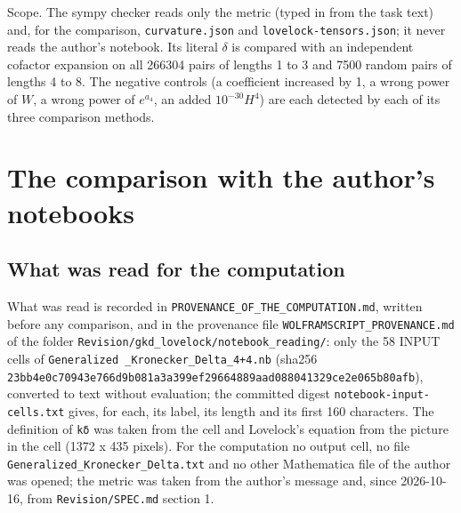 \documentclass[11pt]{article}
\begin{document}
Scope. The sympy checker reads only the metric (typed in from the task text) and, for the comparison, \texttt{curvatur\allowbreak{}e.json} and \texttt{lovelock\allowbreak{}-tensors\allowbreak{}.json}; it never reads the author's notebook. Its literal $\delta$ is compared with an independent cofactor expansion on all 266304 pairs of lengths 1 to 3 and 7500 random pairs of lengths 4 to 8. The negative controls (a coefficient increased by 1, a wrong power of $W$, a wrong power of $e^{a_4}$, an added $10^{-30}H^4$) are each detected by each of its three comparison methods.

\section{The comparison with the author's notebooks}

\subsection{What was read for the computation}

What was read is recorded in \texttt{PROVENAN\allowbreak{}CE\_OF\_TH\allowbreak{}E\_COMPUT\allowbreak{}ATION.md}, written before any comparison, and in the provenance file \texttt{WOLFRAMS\allowbreak{}CRIPT\_PR\allowbreak{}OVENANCE\allowbreak{}.md} of the folder \texttt{Revision\allowbreak{}/gkd\_lov\allowbreak{}elock/no\allowbreak{}tebook\_r\allowbreak{}eading/}: only the 58 INPUT cells of \texttt{Generali\allowbreak{}zed \_Kro\allowbreak{}necker\_D\allowbreak{}elta\_4+4\allowbreak{}.nb} (sha256 \texttt{23bb4e0c\allowbreak{}70943e76\allowbreak{}6d9b081a\allowbreak{}3a399ef2\allowbreak{}9664889a\allowbreak{}ad088041\allowbreak{}329ce2e0\allowbreak{}65b80afb}), converted to text without evaluation; the committed digest \texttt{notebook\allowbreak{}-input-c\allowbreak{}ells.txt} gives, for each, its label, its length and its first 160 characters. The definition of \texttt{kδ} was taken from the cell \texttt{} and Lovelock's equation from the picture in the cell \texttt{} (1372 x 435 pixels). For the computation no output cell, no file \texttt{Generali\allowbreak{}zed\_Kron\allowbreak{}ecker\_De\allowbreak{}lta.txt} and no other Mathematica file of the author was opened; the metric was taken from the author's message and, since 2026-10-16, from \texttt{Revision\allowbreak{}/SPEC.md} section 1.
\end{document}
